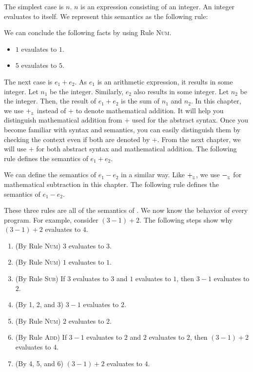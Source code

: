 The simplest case is $n$. $n$ is an expression consisting of an integer. An
integer evaluates to itself. We represent this semantics as the following rule:


We can conclude the following facts by using Rule \textsc{Num}.

\begin{itemize}
  \item $1$ evaulates to $1$.
  \item $5$ evaulates to $5$.
\end{itemize}

The next case is $e_1+e_2$. As $e_1$ is an arithmetic expression, it results in
some integer. Let $n_1$ be the integer. Similarly, $e_2$ also results in some
integer. Let $n_2$ be the integer. Then, the result of $e_1+e_2$ is the sum of
$n_1$ and $n_2$. In this chapter, we use $+_{{}_{\mathbb{Z}}}$ instead of $+$ to denote
mathematical addition. It will help you distinguish mathematical addition from
$+$ used for the abstract syntax. Once you become familiar with syntax and
semantics, you can easily distinguish them by checking the context even if both
are denoted by $+$. From the next chapter, we will use $+$ for both abstract
syntax and mathematical addition. The following rule defines the semantics of
$e_1+e_2$.


We can define the semantics of $e_1-e_2$ in a similar way. Like $+_{{}_{\mathbb{Z}}}$,
we use $-_{{}_{\mathbb{Z}}}$ for mathematical subtraction in this chapter. The
following rule defines the semantics of $e_1-e_2$.


These three rules are all of the semantics of \lang. We now know the behavior of
every \lang program. For example, consider $(3-1)+2$. The following steps
show why $(3-1)+2$ evaluates to $4$.

\begin{enumerate}
  \item (By Rule \textsc{Num}) $3$ evaluates to $3$.
  \item (By Rule \textsc{Num}) $1$ evaluates to $1$.
  \item (By Rule \textsc{Sub}) If $3$ evaluates to $3$ and $1$ evaluates to $1$, then $3-1$
    evaluates to $2$.
  \item (By 1, 2, and 3) $3-1$ evaluates to $2$.
  \item (By Rule \textsc{Num}) $2$ evaluates to $2$.
  \item (By Rule \textsc{Add}) If $3-1$ evaluates to $2$ and $2$ evaluates to $2$, then
    $(3-1)+2$ evaluates to $4$.
  \item (By 4, 5, and 6) $(3-1)+2$ evaluates to $4$.
\end{enumerate}

